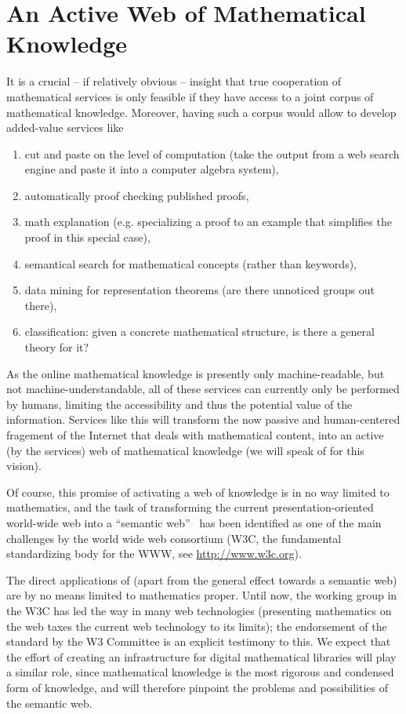 \section{An Active Web of Mathematical Knowledge}\label{sec:mathweb}

It is a crucial -- if relatively obvious -- insight that true cooperation of
mathematical services is only feasible if they have access to a joint corpus of
mathematical knowledge. Moreover, having such a corpus would allow to develop
added-value services like
\begin{enumerate}
\item\label{service:cut-paste} cut and paste on the level of computation (take the
  output from a web search engine and paste it into a computer algebra system),
\item\label{service:proof-check} automatically proof checking published proofs,
\item\label{service:explain} math explanation (e.g. specializing a proof to an
  example that simplifies the proof in this special case),
\item\label{service:search} semantical search for mathematical concepts (rather
  than keywords),
\item\label{service:mine} data mining for representation theorems (are there
  unnoticed groups out there),
\item\label{service:classify} classification: given a concrete mathematical
  structure, is there a general theory for it?
\end{enumerate}
As the online mathematical knowledge is presently only machine-readable, but not
machine-understandable, all of these services can currently only be performed by
humans, limiting the accessibility and thus the potential value of the
information. Services like this will transform the now passive and human-centered
fragement of the Internet that deals with mathematical content, into an active (by
the services) web of mathematical knowledge (we will speak of {}
for this vision).

Of course, this promise of activating a web of knowledge is in no way limited to
mathematics, and the task of transforming the current presentation-oriented
world-wide web into a ``semantic web''~\cite{BernersLee:tsw98} has been identified
as one of the main challenges by the world wide web consortium (W3C, the
fundamental standardizing body for the WWW, see {\url{http://www.w3c.org}}).

The direct applications of {\mathweb} (apart from the general effect towards a
semantic web) are by no means limited to mathematics proper. Until now, the {\mathml}
working group in the W3C has led the way in many web technologies (presenting
mathematics on the web taxes the current web technology to its limits); the
endorsement of the {\mathml} standard by the W3 Committee is an explicit testimony to
this. We expect that the effort of creating an infrastructure for digital
mathematical libraries will play a similar role, since mathematical knowledge is
the most rigorous and condensed form of knowledge, and will therefore pinpoint the
problems and possibilities  of the semantic web.


